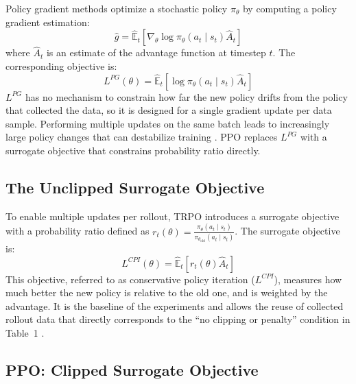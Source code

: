\documentclass{article}
\begin{document}
Policy gradient methods optimize a stochastic policy $\pi_\theta$ by computing a policy gradient estimation:
\begin{equation}
    \hat{g} = \hat{\mathbb{E}}_t \left[ \nabla_\theta \log \pi_\theta(a_t \mid s_t)
    \hat{A}_t \right]
\end{equation}
where $\hat{A}_t$ is an estimate of the advantage function at timestep $t$. The corresponding objective is:
\begin{equation}
    L^{PG}(\theta) = \hat{\mathbb{E}}_t \left[ \log \pi_\theta(a_t \mid s_t)
    \hat{A}_t \right]
\end{equation}
$L^{PG}$ has no mechanism to constrain how far the new policy drifts from the policy that collected the data, so it is designed for a single gradient update per data sample. Performing multiple updates on the same batch leads to increasingly large policy changes that can destabilize training \citep{schulman2017ppo}. PPO replaces $L^{PG}$ with a surrogate objective that constrains probability ratio directly.

\subsection{The Unclipped Surrogate Objective}

To enable multiple updates per rollout, TRPO introduces a surrogate objective \citep{schulman2017trpo} with a probability ratio defined as
$r_t(\theta) = \frac{\pi_\theta(a_t \mid s_t)}{\pi_{\theta_{\text{old}}}(a_t \mid s_t)}$. The surrogate objective is:
\begin{equation}
    L^{CPI}(\theta) = \hat{\mathbb{E}}_t \left[ r_t(\theta) \hat{A}_t \right]
\end{equation}
This objective, referred to as conservative policy iteration ($L^{CPI}$), measures how much better the new policy is relative to the old one, and is weighted by the advantage. It is the baseline of the experiments and allows the reuse of collected rollout data that directly corresponds to the ``no clipping or penalty'' condition in Table~1 \citep{schulman2017ppo}.

\subsection{PPO: Clipped Surrogate Objective}
\end{document}

